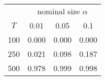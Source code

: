 % 
\begin{tabular}{cccc}
  \hline
  & \multicolumn{3}{c}{nominal size $\alpha$} \\
 $T$ & 0.01 & 0.05 & 0.1 \\
 \hline
100 & 0.000 & 0.000 & 0.000 \\ 
  250 & 0.021 & 0.098 & 0.187 \\ 
  500 & 0.978 & 0.999 & 0.998 \\ 
   \hline
\end{tabular}
